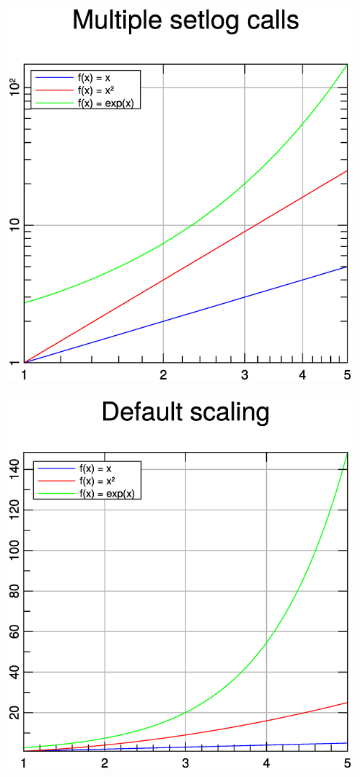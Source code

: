 \documentclass[a4paper]{article}
\begin{document}
\begin{figure}[h]
  \centering
  \begin{subfigure}[hb]{.32\linewidth}
    \includegraphics[width=\textwidth]{./examples_from_doc/setlog/setlog_1.eps}
  \end{subfigure}
    \hspace{2cm}
  \begin{subfigure}[hb]{.32\linewidth}
    \includegraphics[width=\textwidth]{./examples_from_doc/setlog/setlog_2.eps}
  \end{subfigure}
\end{figure}
\end{document}
